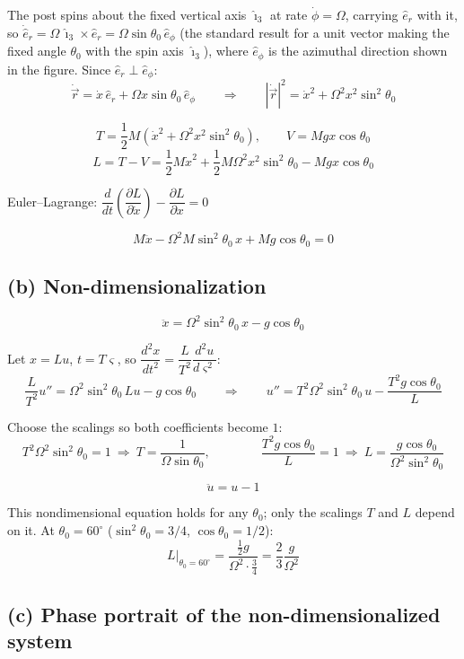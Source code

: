 \documentclass[11pt]{article}
\begin{document}
The post spins about the fixed vertical axis $\hat\imath_3$ at rate $\dot\phi=\Omega$, carrying $\hat e_r$ with it, so $\dot{\hat e}_r=\Omega\,\hat\imath_3\times\hat e_r=\Omega\sin\theta_0\,\hat e_\phi$ (the standard result for a unit vector making the fixed angle $\theta_0$ with the spin axis $\hat\imath_3$), where $\hat e_\phi$ is the azimuthal direction shown in the figure. Since $\hat e_r\perp\hat e_\phi$:
\[
\dot{\vec r}=\dot x\,\hat e_r+\Omega x\sin\theta_0\,\hat e_\phi
\qquad\Longrightarrow\qquad
|\dot{\vec r}|^2=\dot x^2+\Omega^2x^2\sin^2\theta_0
\]

\[
T=\frac12M\left(\dot x^2+\Omega^2x^2\sin^2\theta_0\right), \qquad V=Mgx\cos\theta_0
\]
\[
L=T-V=\frac12M\dot x^2+\frac12M\Omega^2x^2\sin^2\theta_0-Mgx\cos\theta_0
\]

Euler--Lagrange: $\dfrac{d}{dt}\!\left(\dfrac{\partial L}{\partial \dot x}\right)-\dfrac{\partial L}{\partial x}=0$

\begin{result}
\[
M\ddot x-\Omega^2M\sin^2\theta_0\,x+Mg\cos\theta_0=0
\]
\end{result}

\subsection*{(b) Non-dimensionalization}

\[
\ddot x=\Omega^2\sin^2\theta_0\,x-g\cos\theta_0
\]

Let $x=Lu$, $t=T\varsigma$, so $\dfrac{d^2x}{dt^2}=\dfrac{L}{T^2}\dfrac{d^2u}{d\varsigma^2}$:
\[
\frac{L}{T^2}u''=\Omega^2\sin^2\theta_0\,Lu-g\cos\theta_0
\qquad\Longrightarrow\qquad
u''=T^2\Omega^2\sin^2\theta_0\,u-\frac{T^2g\cos\theta_0}{L}
\]

Choose the scalings so both coefficients become $1$:
\[
T^2\Omega^2\sin^2\theta_0=1 \ \Rightarrow\ T=\frac{1}{\Omega\sin\theta_0},
\qquad\qquad
\frac{T^2g\cos\theta_0}{L}=1 \ \Rightarrow\ L=\frac{g\cos\theta_0}{\Omega^2\sin^2\theta_0}
\]

\begin{result}
\[
\ddot u = u-1
\]
\end{result}
This nondimensional equation holds for any $\theta_0$; only the scalings $T$ and $L$ depend on it. At $\theta_0=60^\circ$ ($\sin^2\theta_0=3/4$, $\cos\theta_0=1/2$):
\[
L\Big|_{\theta_0=60^\circ}=\frac{\frac12g}{\Omega^2\cdot\frac34}=\frac23\frac{g}{\Omega^2}
\]

\subsection*{(c) Phase portrait of the non-dimensionalized system}
\end{document}
